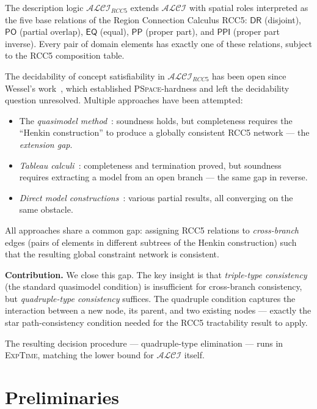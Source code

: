 \documentclass[a4paper,11pt]{article}
\theoremstyle{definition}
\newcommand{\ALCI}{\ensuremath{\mathcal{ALCI}}}
\newcommand{\ALCIRCC}[1]{\ensuremath{\mathcal{ALCI}_{\mathit{RCC#1}}}}
\newcommand{\DR}{\ensuremath{\mathsf{DR}}}
\newcommand{\PO}{\ensuremath{\mathsf{PO}}}
\newcommand{\EQ}{\ensuremath{\mathsf{EQ}}}
\newcommand{\PP}{\ensuremath{\mathsf{PP}}}
\newcommand{\PPI}{\ensuremath{\mathsf{PPI}}}
\newcommand{\EXPTIME}{\textsc{ExpTime}}
\newcommand{\PSPACE}{\textsc{PSpace}}
\begin{document}
The description logic $\ALCIRCC{5}$ extends $\ALCI$ with spatial
roles interpreted as the five base relations of the Region
Connection Calculus RCC5: $\DR$ (disjoint), $\PO$ (partial
overlap), $\EQ$ (equal), $\PP$ (proper part), and $\PPI$ (proper
part inverse).  Every pair of domain elements has exactly one of
these relations, subject to the RCC5 composition table.

The decidability of concept satisfiability in $\ALCIRCC{5}$ has
been open since Wessel's work~\cite{Wessel2002,Wessel2003}, which
established \PSPACE-hardness and left the decidability question
unresolved.  Multiple approaches have been attempted:
\begin{itemize}[nosep]
  \item The \emph{quasimodel method}~\cite{CompanionPaper}:
    soundness holds, but completeness requires the ``Henkin
    construction'' to produce a globally consistent RCC5 network
    --- the \emph{extension gap}.
  \item \emph{Tableau calculi}~\cite{TableauPaper}: completeness
    and termination proved, but soundness requires extracting a
    model from an open branch --- the same gap in reverse.
  \item \emph{Direct model constructions}~\cite{TrianglePaper,%
    TwoTierPaper,DirectPaper}: various partial results, all
    converging on the same obstacle.
\end{itemize}

All approaches share a common gap: assigning RCC5 relations to
\emph{cross-branch} edges (pairs of elements in different
subtrees of the Henkin construction) such that the resulting
global constraint network is consistent.

\medskip\noindent\textbf{Contribution.}\;  We close this gap.
The key insight is that \emph{triple-type consistency} (the
standard quasimodel condition) is insufficient for cross-branch
consistency, but \emph{quadruple-type consistency} suffices.
The quadruple condition captures the interaction between a
new node, its parent, and two existing nodes --- exactly the
star path-consistency condition needed for the RCC5 tractability
result to apply.

The resulting decision procedure --- quadruple-type elimination
--- runs in \EXPTIME, matching the lower bound for $\ALCI$
itself.


\section{Preliminaries}
\label{sec:prelim}
\end{document}
